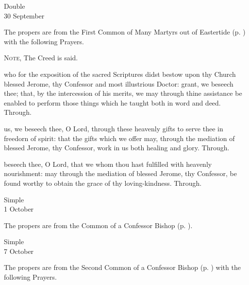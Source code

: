 

\begin{inhead}
	{Double\\
		30 September}
\end{inhead}
\begin{rubric}
	The propers are from the First Common of Many Martyrs out of Eastertide (p. \pageref{CommonMartyrsI}) with the following Prayers.\par
	\textsc{Note,} The Creed is said.
\end{rubric}

\collect
{} who for the exposition of the sacred Scriptures didst bestow upon thy Church blessed Jerome, thy Confessor and most illustrious Doctor: grant, we beseech thee; that, by the intercession of his merits, we may through thine assistance be enabled to perform those things which he taught both in word and deed. Through.

\secret
{} us, we beseech thee, O Lord, through these heavenly gifts to serve thee in freedorn of spirit: that the gifts which we offer may, through the mediation of blessed Jerome, thy Confessor, work in us both healing and glory. Through.

\postcommunion
{} beseech thee, O Lord, that we whom thou hast fulfilled with heavenly nourishment: may through the mediation of blessed Jerome, thy Confessor, be found worthy to obtain the grace of thy loving-kindness. Through.

\begin{inhead}
	{Simple\\
		1 October}
\end{inhead}
\begin{rubric}
	The propers are from the Common of a Confessor Bishop (p. \pageref{CommonConfessorBishopI}).
\end{rubric}





\begin{inhead}
	{Simple\\
		7 October}
\end{inhead}

\begin{rubric}
	The propers are from the Second Common of a Confessor Bishop (p. \pageref{CommonConfessorBishopII}) with the following Prayers.
\end{rubric}


